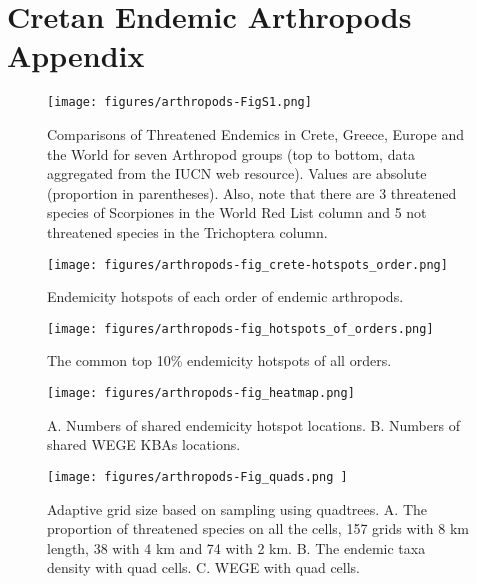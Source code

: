 
\chapter{Cretan Endemic Arthropods Appendix} %

\label{AppendixC} 


   \begin{figure}[h]
      \centering
      \texttt{[image: figures/arthropods-FigS1.png]}
      \caption[Comparisons of Threatened Endemics in Crete, Greece, Europe and the World]{Comparisons of Threatened Endemics in Crete, Greece, Europe and the World for seven Arthropod groups (top to bottom, data aggregated from the IUCN web resource). Values are absolute (proportion in parentheses). Also, note that there are 3 threatened species of Scorpiones in the World Red List column and 5 not threatened species in the Trichoptera column.}
      \label{fig:arthropods-figS1}
   \end{figure}

   \begin{figure}[h]
      \centering
      \texttt{[image: figures/arthropods-fig\_crete-hotspots\_order.png]}
      \caption[Endemicity hotspots of each order of endemic arthropods]{Endemicity hotspots of each order of endemic arthropods.}
      \label{fig:arthropods-figS2}
   \end{figure}

   \begin{figure}[h]
      \centering
      \texttt{[image: figures/arthropods-fig\_hotspots\_of\_orders.png]}
      \caption[The common endemicity hotspots of all orders]{The common top 10\% endemicity hotspots of all orders.}
      \label{fig:arthropods-figS3}
   \end{figure}

   \begin{figure}[h]
      \centering
      \texttt{[image: figures/arthropods-fig\_heatmap.png]}
      \caption[Heatmaps of shared hotspots and KBEs]{A. Numbers of shared endemicity hotspot locations. B. Numbers of shared WEGE KBAs locations.}
      \label{fig:arthropods-figS4}
   \end{figure}

   \begin{figure}[h]
      \centering
      \texttt{[image: figures/arthropods-Fig\_quads.png ]}
      \caption[Adaptive grid size based on sampling using quadtrees]{Adaptive grid size based on sampling using quadtrees. A. The proportion of threatened species on all the cells, 157 grids with 8 km length, 38 with 4 km and 74 with 2 km. B. The endemic taxa density with quad cells. C. WEGE with quad cells.}
      \label{fig:arthropods-figS5}
   \end{figure}

